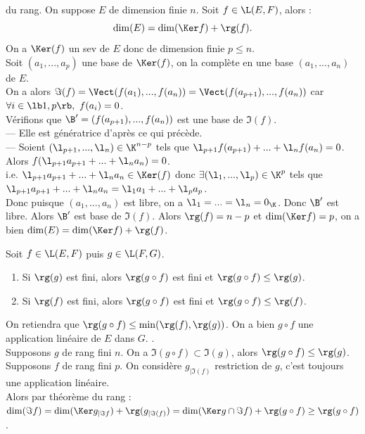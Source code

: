 \documentclass[11pt]{article}
\begin{document}
\begin{thm}{du rang.}{}
    On suppose $E$ de dimension finie $n$. Soit $f\in\L(E,F)$, alors :
    \begin{equation*}
        \dim(E)=\dim(\Ker f)+\rg(f).
    \end{equation*}
    \tcblower
    On a $\Ker(f)$ un sev de $E$ donc de dimension finie $p\leq n$.\\
    Soit $(a_1,...,a_p)$ une base de $\Ker(f)$, on la complète en une base $(a_1,...,a_n)$ de $E$.\\
    On a alors $\Im(f)=\Vect(f(a_1),...,f(a_n))=\Vect(f(a_{p+1}),...,f(a_n))$ car $\forall i \in \lb1,p\rb, ~ f(a_i)=0$.\\
    Vérifions que $\B'=(f(a_{p+1}),...,f(a_n))$ est une base de $\Im(f)$.\\
    --- Elle est génératrice d'après ce qui précède.\\
    --- Soient $(\l_{p+1},...,\l_n)\in\K^{n-p}$ tels que $\l_{p+1}f(a_{p+1})+...+\l_nf(a_n)=0$. Alors $f(\l_{p+1}a_{p+1}+...+\l_na_n)=0$.\\
    i.e. $\l_{p+1}a_{p+1}+...+\l_na_n\in\Ker(f)$ donc $\exists(\l_1,...,\l_p)\in\K^p$ tels que $\l_{p+1}a_{p+1}+...+\l_na_n=\l_1a_1+...+\l_pa_p$.\\
    Donc puisque $(a_1,...,a_n)$ est libre, on a $\l_1=...=\l_n=0_\K$. Donc $\B'$ est libre.\n
    Alors $\B'$ est base de $\Im(f)$. Alors $\rg(f)=n-p$ et $\dim(\Ker f)=p$, on a bien $\dim(E)=\dim(\Ker f)+\rg(f)$.
\end{thm}

\begin{prop}{}{}
    Soit $f\in\L(E,F)$ puis $g\in\L(F,G)$.
    \begin{enumerate}
        \item Si $\rg(g)$ est fini, alors $\rg(g\circ f)$ est fini et $\rg(g\circ f)\leq\rg(g)$.
        \item Si $\rg(f)$ est fini, alors $\rg(g\circ f)$ est fini et $\rg(g\circ f)\leq\rg(f)$.
    \end{enumerate}
    On retiendra que $\rg(g\circ f)\leq\min(\rg(f),\rg(g))$.
    \tcblower
    On a bien $g\circ f$ une application linéaire de $E$ dans $G$. .\\
     Supposons $g$ de rang fini $n$. On a $\Im(g\circ f)\subset\Im(g)$, alors $\rg(g\circ f)\leq \rg(g)$.\\
     Supposons $f$ de rang fini $p$. On considère $g_{|\Im(f)}$ restriction de $g$, c'est toujours une application linéaire.\\
    Alors par théorème du rang : $\dim(\Im f) = \dim(\Ker g_{|\Im f}) + \rg(g_{|\Im(f)})=\dim(\Ker g \cap \Im f)+\rg(g\circ f)\geq\rg(g\circ f)$.
\end{prop}
\end{document}

